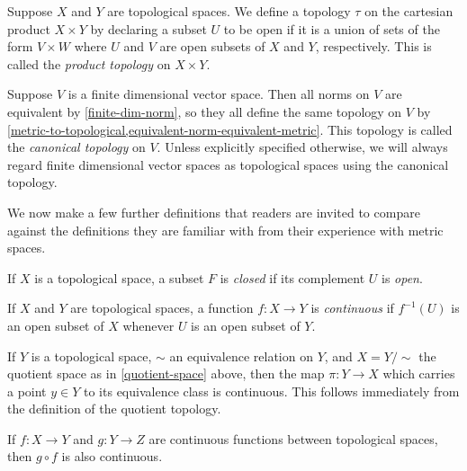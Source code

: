 \begin{example} \label{product-space}
	Suppose $X$ and $Y$ are topological spaces. We define a topology $\tau$ on the cartesian product $X \times Y$ by declaring a subset $U$ to be open if it is a union of sets of the form $V \times W$ where $U$ and $V$ are open subsets of $X$ and $Y$, respectively. This is called the \emph{product topology} on $X \times Y$. 
\end{example}

\begin{example} \label{finite-dim-canonical-topology}
	Suppose $V$ is a finite dimensional vector space. Then all norms on $V$ are equivalent by \cref{finite-dim-norm}, so they all define the same topology on $V$ by \cref{metric-to-topological,equivalent-norm-equivalent-metric}. This topology is called the \emph{canonical topology} on $V$. Unless explicitly specified otherwise, we will always regard finite dimensional vector spaces as topological spaces using the canonical topology. 
\end{example}

We now make a few further definitions that readers are invited to compare against the definitions they are familiar with from their experience with metric spaces. 

\begin{definition}
	If $X$ is a topological space, a subset $F$ is \emph{closed} if its complement $U$ is \emph{open}. 
\end{definition}

\begin{definition}
	If $X$ and $Y$ are topological spaces, a function $f : X \to Y$ is \emph{continuous} if $f^{-1}(U)$ is an open subset of $X$ whenever $U$ is an open subset of $Y$. 
\end{definition}

\begin{example}
	If $Y$ is a topological space, $\sim$ an equivalence relation on $Y$, and $X = Y/\sim$ the quotient space as in \cref{quotient-space} above, then the map $\pi : Y \to X$ which carries a point $y \in Y$ to its equivalence class is continuous. This follows immediately from the definition of the quotient topology.
\end{example}

\begin{exercise}
	If $f : X \to Y$ and $g : Y \to Z$ are continuous functions between topological spaces, then $g \circ f$ is also continuous. 
\end{exercise}

